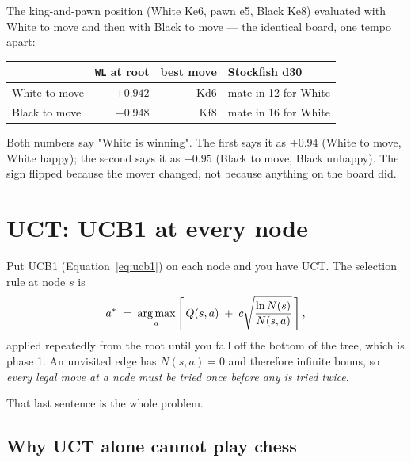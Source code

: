 \begin{realdata}[title={Real engine output: the same position from both sides}]
The king-and-pawn position (White Ke6, pawn e5, Black Ke8) evaluated with White to move and
then with Black to move --- the identical board, one tempo apart:
\begin{center}
\begin{tabular}{@{}lrrl@{}}
\toprule
 & \texttt{WL} at root & best move & Stockfish d30 \\
\midrule
White to move & $+0.942$ & Kd6 & mate in 12 for White \\
Black to move & $-0.948$ & Kf8 & mate in 16 for White \\
\bottomrule
\end{tabular}
\end{center}
Both numbers say "White is winning". The first says it as $+0.94$ (White to move, White
happy); the second says it as $-0.95$ (Black to move, Black unhappy). The sign flipped
because the mover changed, not because anything on the board did.
\end{realdata}

\section{UCT: UCB1 at every node}

Put UCB1 (Equation~\eqref{eq:ucb1}) on each node and you have UCT. The selection rule at
node $s$ is
\begin{equation}
  \label{eq:uct}
  a^{*} \;=\; \operatorname*{arg\,max}_{a}\left[\, Q(s,a) \;+\; c\sqrt{\frac{\ln N(s)}{N(s,a)}} \,\right],
\end{equation}
applied repeatedly from the root until you fall off the bottom of the tree, which is phase 1.
An unvisited edge has $N(s,a) = 0$ and therefore infinite bonus, so \emph{every legal move at
a node must be tried once before any is tried twice}.

That last sentence is the whole problem.

\subsection{Why UCT alone cannot play chess}

